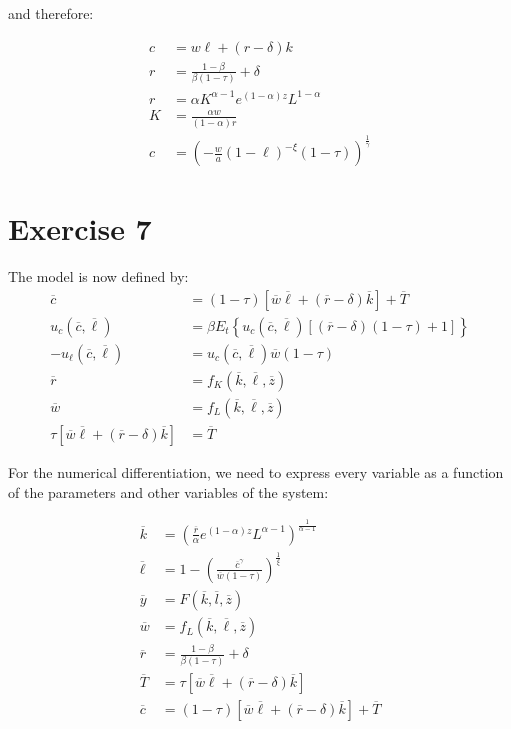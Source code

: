 \documentclass[11pt]{article}
\numberwithin{equation}{section}
\theoremstyle{plain}
\theoremstyle{definition}
\newcommand\parens[1]{\left( #1 \right)}
\newcommand{\1}{\mathbbm 1}
\def\a{\alpha}
\def\b{\beta}
\def\g{\gamma}
\def\d{\delta}
\def\t{\tau}
\begin{document}
and therefore:

\begin{align}
c&=w \ell+ (r-\delta) k \\
r&= \frac{1-\b}{\b (1 - \t)} + \d \\
r&=\a K^{\alpha - 1} e^{(1-\alpha)z}L^{1-\a}\\
K &= \frac{\a w}{(1-\a)r}\\
c &= \parens{-\frac{w}{a}(1-\ell)^{-\xi}(1-\tau)}^{\frac{1}{\g}}
\end{align}


\section*{Exercise 7}
The model is now defined by:
\begin{align*}
\overline{c}&=(1-\tau)[\overline{w} \overline{\ell}+(\overline{r}-\delta) \overline{k}]+\overline{T} \\ 
u_{c}(\overline{c}, \overline{\ell})&=\beta E_{t}\left\{u_{c}(\overline{c}, \overline{\ell})[(\overline{r}-\delta)(1-\tau)+1]\right\} \\ 
-u_{\ell}(\overline{c}, \overline{\ell})&=u_{c}(\overline{c}, \overline{\ell}) \overline{w}(1-\tau) \\ 
\overline{r}&=f_{K}(\overline{k}, \overline{\ell}, \overline{z}) \\ 
\overline{w}&=f_{L}(\overline{k}, \overline{\ell}, \overline{z}) \\ 
\tau[\overline{w} \overline{\ell}+(\overline{r}-\delta) \overline{k}]&=\overline{T}
\end{align*}

For the numerical differentiation, we need to express every variable as a function of the parameters and other variables of the system:

\begin{align*}
\overline{k} &= \parens{\frac{\overline{r}}{\a} e^{(1-\alpha)z}L^{\a-1}}^{\frac{1}{\alpha - 1}} \\
\overline{\ell} &= 1 - \parens{\frac{\overline{c}^{\g}}{\overline{w}(1-\tau)}}^{\frac{1}{\xi}}  \\
\overline{y} &= F(\overline{k},\overline{l},\overline{z}) \\
\overline{w}&=f_{L}(\overline{k}, \overline{\ell}, \overline{z}) \\
\overline{r}&= \frac{1-\b}{\b (1 - \t)} + \d \\ 
\overline{T}&=\tau[\overline{w} \overline{\ell}+(\overline{r}-\delta) \overline{k}] \\
\overline{c}&=(1-\tau)[\overline{w} \overline{\ell}+(\overline{r}-\delta) \overline{k}]+\overline{T}
\end{align*}
\end{document}
